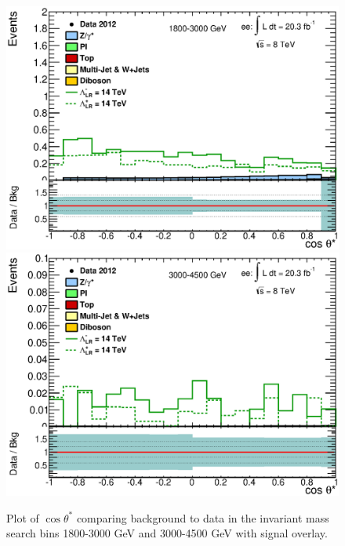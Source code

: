 	\begin{figure}[ht]
		\centering
			\includegraphics[width=0.49\linewidth]{images/CosThetaStar_bin_5.eps}
			\includegraphics[width=0.49\linewidth]{images/CosThetaStar_bin_6.eps}
		\caption{Plot of $\cos{\theta^{*}}$ comparing background to data in the invariant mass search bins 1800-3000 GeV and 3000-4500 GeV with signal overlay.}
		\label{fig:cosTS_5}
	\end{figure}







